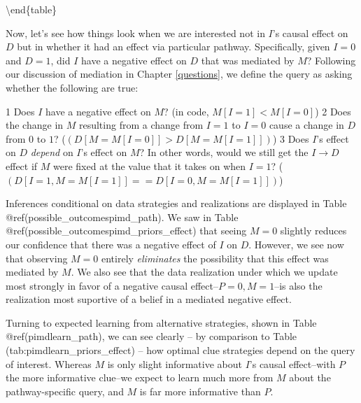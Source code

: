 \documentclass[12pt,]{book}
\begin{document}
\textbackslash{}end\{table\}

Now, let's see how things look when we are interested not in \(I\)'s causal effect on \(D\) but in whether it had an effect via particular pathway. Specifically, given \(I=0\) and \(D=1\), did \(I\) have a negative effect on \(D\) that was mediated by \(M\)? Following our discussion of mediation in Chapter \ref{questions}, we define the query as asking whether the following are true:

1 Does \(I\) have a negative effect on \(M\)? (in code, \(M[I=1] < M[I=0]\))
2 Does the change in \(M\) resulting from a change from \(I=1\) to \(I=0\) cause a change in \(D\) from \(0\) to \(1\)? (\((D[M=M[I=0]] > D[M=M[I=1]])\))
3 Does \(I\)'s effect on \(D\) \emph{depend} on \(I\)'s effect on \(M\)? In other words, would we still get the \(I \rightarrow D\) effect if \(M\) were fixed at the value that it takes on when \(I=1\)? (\((D[I=1, M=M[I=1]] == D[I=0, M=M[I=1]])\))

Inferences conditional on data strategies and realizations are displayed in Table @ref(possible\_outcomespimd\_path). We saw in Table @ref(possible\_outcomespimd\_priors\_effect) that seeing \(M=0\) slightly reduces our confidence that there was a negative effect of \(I\) on \(D\). However, we see now that observing \(M=0\) entirely \emph{eliminates} the possibility that this effect was mediated by \(M\). We also see that the data realization under which we update most strongly in favor of a negative causal effect--\(P=0, M=1\)--is also the realization most suportive of a belief in a mediated negative effect.

Turning to expected learning from alternative strategies, shown in Table @ref(pimdlearn\_path), we can see clearly -- by comparison to Table (tab:pimdlearn\_priors\_effect) -- how optimal clue strategies depend on the query of interest. Whereas \(M\) is only slight informative about \(I\)'s causal effect--with \(P\) the more informative clue--we expect to learn much more from \(M\) about the pathway-specific query, and \(M\) is far more informative than \(P\).
\end{document}
